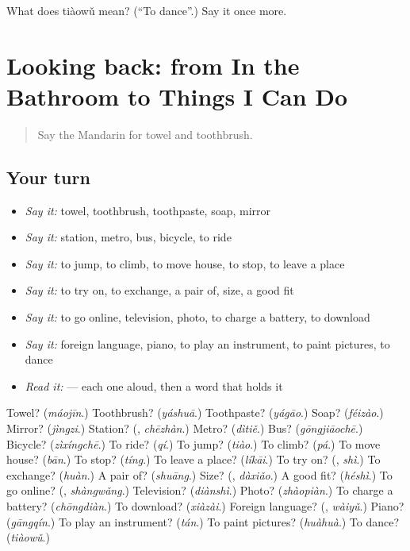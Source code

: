 \begin{tcolorbox}[breakable,colback=teal!4,colframe=teal!35!black,title={Before you move on}]
What does tiàowǔ mean? (\textquotedblleft{}To dance\textquotedblright{}.) Say it once more.
\end{tcolorbox}
\section[(dialogue)]{Looking back: from In the Bathroom to Things I Can Do}

\label{lesson:ZH-R110-review-105-110}



\begin{quote}
Say the Mandarin for towel and toothbrush.
\end{quote}

\subsection*{Your turn}
\begin{itemize}
\raggedright
  \item \emph{Say it:} towel, toothbrush, toothpaste, soap, mirror
  \item \emph{Say it:} station, metro, bus, bicycle, to ride
  \item \emph{Say it:} to jump, to climb, to move house, to stop, to leave a place
  \item \emph{Say it:} to try on, to exchange, a pair of, size, a good fit
  \item \emph{Say it:} to go online, television, photo, to charge a battery, to download
  \item \emph{Say it:} foreign language, piano, to play an instrument, to paint pictures, to dance
  \item \emph{Read it:}     — each one aloud, then a word that holds it
\end{itemize}

\begin{tcolorbox}[breakable,colback=teal!4,colframe=teal!35!black,title={Before you move on}]
Towel? (\emph{máojīn}.) Toothbrush? (\emph{yáshuā}.) Toothpaste? (\emph{yágāo}.) Soap? (\emph{féizào}.) Mirror? (\emph{jìngzi}.) Station? (\textbf{}, \emph{chēzhàn}.) Metro? (\emph{dìtiě}.) Bus? (\emph{gōngjiāochē}.) Bicycle? (\emph{zìxíngchē}.) To ride? (\emph{qí}.) To jump? (\emph{tiào}.) To climb? (\emph{pá}.) To move house? (\emph{bān}.) To stop? (\emph{tíng}.) To leave a place? (\emph{líkāi}.) To try on? (\textbf{}, \emph{shì}.) To exchange? (\emph{huàn}.) A pair of? (\emph{shuāng}.) Size? (\textbf{}, \emph{dàxiǎo}.) A good fit? (\emph{héshì}.) To go online? (\textbf{}, \emph{shàngwǎng}.) Television? (\emph{diànshì}.) Photo? (\emph{zhàopiàn}.) To charge a battery? (\emph{chōngdiàn}.) To download? (\emph{xiàzài}.) Foreign language? (\textbf{}, \emph{wàiyǔ}.) Piano? (\emph{gāngqín}.) To play an instrument? (\emph{tán}.) To paint pictures? (\emph{huàhuà}.) To dance? (\emph{tiàowǔ}.)
\end{tcolorbox}
